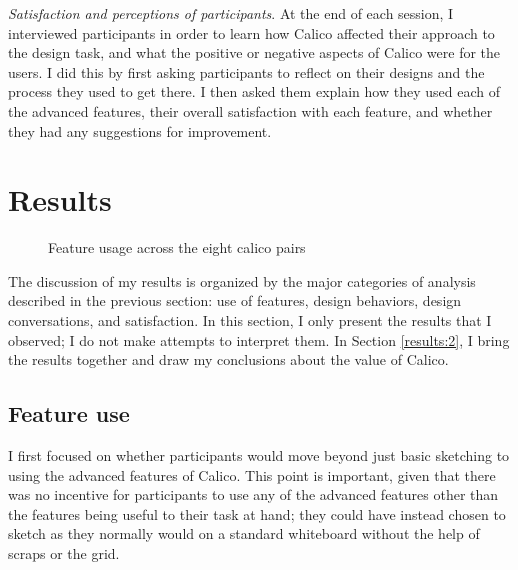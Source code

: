     \emph{Satisfaction and perceptions of participants}. At the end of each session, I interviewed participants in order to learn how Calico affected their approach to the design task, and what the positive or negative aspects of Calico were for the users. I did this by first asking participants to reflect on their designs and the process they used to get there. I then asked them explain how they used each of the advanced features, their overall satisfaction with each feature, and whether they had any suggestions for improvement. 

\section{Results}
\label{results}



\begin{figure}
  \centering


 
\caption{Feature usage across the eight calico pairs}
\label{fig:6}       %
\end{figure}
%


The discussion of my results is organized by the major categories of analysis described in the previous section: use of features, design behaviors, design conversations, and satisfaction. In this section, I only present the results that I observed; I do not make attempts to interpret them. In Section \ref{results:2}, I bring the results together and draw my conclusions about the value of Calico.

\subsection{Feature use}
\label{results:1}

I first focused on whether participants would move beyond just basic sketching to using the advanced features of Calico. This point is important, given that there was no incentive for participants to use any of the advanced features other than the features being useful to their task at hand; they could have instead chosen to sketch as they normally would on a standard whiteboard without the help of scraps or the grid. 

